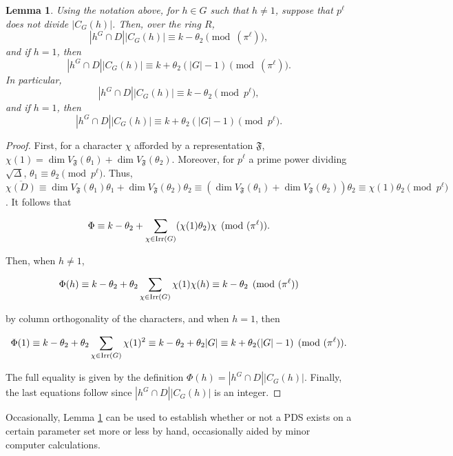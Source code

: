 \documentclass[12pt]{amsproc} %
\newtheorem{lem}[thm]{Lemma}
\theoremstyle{definition}\newtheorem{defn}[thm]{Definition}
\theoremstyle{definition}\newtheorem{rem}[thm]{Remark}
\theoremstyle{definition}\newtheorem{ex}[thm]{Example}
\newcommand{\Irr}{{\rm Irr}}
\newcommand{\repF}{\mathfrak{F}}
\begin{document}
\begin{lem}\label{char-p-phi}
Using the notation above, for $h \in G$ such that $h \neq 1$, suppose that $p^\ell$ does not divide $|C_G(h)|$. Then, over the ring $R$,
	\begin{equation*}
		|h^G \cap D||C_G(h)| \equiv k - \theta_2 \pmod {(\pi^\ell)},
	\end{equation*}
and if $h = 1$, then \[|h^G \cap D||C_G(h)| \equiv k + \theta_2(|G| - 1) \pmod {(\pi^\ell)}.\]
In particular, 
\begin{equation*}
		|h^G \cap D||C_G(h)| \equiv k - \theta_2 \pmod {p^\ell},
	\end{equation*}
and if $h = 1$, then \[|h^G \cap D||C_G(h)| \equiv k + \theta_2(|G| - 1) \pmod {p^\ell}.\]
\end{lem}
	\begin{proof}
	First, for a character $\chi$ afforded by a representation $\repF$, $\chi(1) = \dim V_\repF(\theta_1) + \dim V_\repF(\theta_2)$. Moreover, for $p^\ell$ a prime power dividing $\sqrt\Delta$, $\theta_1 \equiv \theta_2 \pmod{p^\ell}$. Thus, $\overline{\chi(D)} \equiv \dim V_\repF(\theta_1)\theta_1 + \dim V_\repF(\theta_2)\theta_2 \equiv (\dim V_\repF(\theta_1) + \dim V_\repF(\theta_2))\theta_2 \equiv \chi(1)\theta_2 \pmod{p^\ell}$. It follows that 
	
		\[\Phi \equiv k - \theta_2 + \sum_{\chi\in\Irr(G)}(\chi(1)\theta_2)\chi \pmod {(\pi^\ell)}. \]
	
	Then, when $h \neq 1$,
	
		\[\Phi(h) \equiv k - \theta_2 + \theta_2\sum_{\chi\in\Irr(G)}\chi(1)\chi(h) \equiv k - \theta_2 \pmod {(\pi^\ell)}\]
		
	by column orthogonality of the characters, and when $h = 1$, then
	
		\[\Phi(1) \equiv k - \theta_2 + \theta_2\sum_{\chi\in\Irr(G)}\chi(1)^2 \equiv k-\theta_2 + \theta_2|G| \equiv k + \theta_2(|G| - 1) \pmod {(\pi^\ell)}.\]
	
	The full equality is given by the definition $\Phi(h) = |h^G \cap D||C_G(h)|$. Finally, the last equations follow since $|h^G \cap D||C_G(h)|$ is an integer. 
	\end{proof}

Occasionally, Lemma \ref{char-p-phi} can be used to establish whether or not a PDS exists on a certain parameter set more or less by hand, occasionally aided by minor computer calculations.
\end{document}

